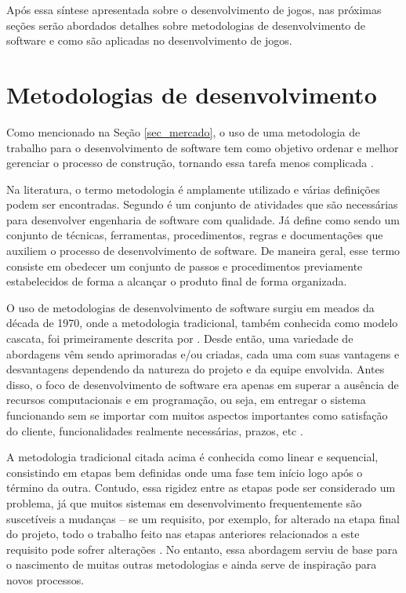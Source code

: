 \documentclass[quali]{ppgccufscar}
\begin{document}
Após essa síntese apresentada sobre o desenvolvimento de jogos, nas próximas seções serão abordados detalhes sobre metodologias de desenvolvimento de software e como são aplicadas no desenvolvimento de jogos.


\section{Metodologias de desenvolvimento}
\label{sec_metodologias}

Como mencionado na Seção \ref{sec_mercado}, o uso de uma metodologia de trabalho para o desenvolvimento de software tem como objetivo ordenar e melhor gerenciar o processo de construção, tornando essa tarefa menos complicada \cite{sommerville2010,pressman2005}. 

Na literatura, o termo metodologia é amplamente utilizado e várias definições podem ser encontradas. Segundo  é um conjunto de atividades que são necessárias para desenvolver engenharia de software com qualidade. Já  define como sendo um conjunto de técnicas, ferramentas, procedimentos, regras e documentações que auxiliem o processo de desenvolvimento de software. De maneira geral, esse termo consiste em obedecer um conjunto de passos e procedimentos previamente estabelecidos de forma a alcançar o produto final de forma organizada. 

O uso de metodologias de desenvolvimento de software surgiu em meados da década de 1970, onde a metodologia tradicional, também conhecida como modelo cascata, foi primeiramente descrita por . Desde então, uma variedade de abordagens vêm sendo aprimoradas e/ou criadas, cada uma com suas vantagens e desvantagens dependendo da natureza do projeto e da equipe envolvida. Antes disso, o foco de desenvolvimento de software era apenas em superar a ausência de recursos computacionais e em programação, ou seja, em entregar o sistema funcionando sem se importar com muitos aspectos importantes como satisfação do cliente, funcionalidades realmente necessárias, prazos, etc \cite{aveson2006}.

A metodologia tradicional citada acima é conhecida como linear e sequencial, consistindo em etapas bem definidas onde uma fase tem início logo após o término da outra. Contudo, essa rigidez entre as etapas pode ser considerado um problema, já que muitos sistemas em desenvolvimento frequentemente são suscetíveis a mudanças -- se um requisito, por exemplo, for alterado na etapa final do projeto, todo o trabalho feito nas etapas anteriores relacionados a este requisito pode sofrer alterações \cite{pressman2005}. No entanto, essa abordagem serviu de base para o nascimento de muitas outras metodologias e ainda serve de inspiração para novos processos.
\end{document}
